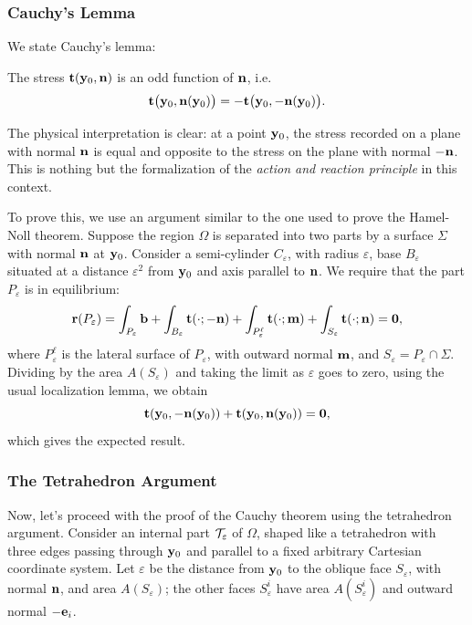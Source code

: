 \subsubsection{Cauchy’s Lemma}
We state Cauchy’s lemma:

\begin{definition}
	The stress \(\mathbf{t}(\mathbf{y}_0, \mathbf{n})\) is an odd function of \(\mathbf{n}\), i.e.
	\begin{equation}\label{lemmaC}
		\mathbf{t}\big(\mathbf{y}_0, \mathbf{n}(\mathbf{y}_0)\big) = -\mathbf{t}\big(\mathbf{y}_0, -\mathbf{n}(\mathbf{y}_0)\big).
	\end{equation}
\end{definition}

The physical interpretation is clear: at a point \(\mathbf{y}_0\), the stress recorded on a plane with normal \(\mathbf{n}\) is equal and opposite to the stress on the plane with normal \(-\mathbf{n}\). This is nothing but the formalization of the \textit{action and reaction principle} in this context.

To prove this, we use an argument similar to the one used to prove the Hamel-Noll theorem. Suppose the region \(\Omega\) is separated into two parts by a surface \(\Sigma\) with normal \(\mathbf{n}\) at \(\mathbf{y}_0\). Consider a semi-cylinder \(C_\varepsilon\), with radius \(\varepsilon\), base \(B_\varepsilon\) situated at a distance \(\varepsilon^2\) from \(\mathbf{y}_0\) and axis parallel to \(\mathbf{n}\). We require that the part \(P_\varepsilon\) is in equilibrium:
\begin{equation}
	\mathbf{r}(P_\varepsilon) = \int_{P_\varepsilon} \mathbf{b} + \int_{B_\varepsilon} \mathbf{t}(\cdot; -\mathbf{n}) + \int_{P^\ell_\varepsilon} \mathbf{t}(\cdot; \mathbf{m}) + \int_{S_\varepsilon} \mathbf{t}(\cdot; \mathbf{n}) = \mathbf{0},
\end{equation}
where \(P^\ell_\varepsilon\) is the lateral surface of \(P_\varepsilon\), with outward normal \(\mathbf{m}\), and \(S_\varepsilon = P_\varepsilon \cap \Sigma\). Dividing by the area \(A(S_\varepsilon)\) and taking the limit as \(\varepsilon\) goes to zero, using the usual localization lemma, we obtain
\begin{equation}
	\mathbf{t}(\mathbf{y}_0, -\mathbf{n}(\mathbf{y}_0)) + \mathbf{t}(\mathbf{y}_0, \mathbf{n}(\mathbf{y}_0)) = \mathbf{0},
\end{equation}
which gives the expected result.

\subsubsection{The Tetrahedron Argument}
Now, let’s proceed with the proof of the Cauchy theorem using the tetrahedron argument. Consider an internal part \(\mathcal{T}_\varepsilon\) of \(\Omega\), shaped like a tetrahedron with three edges passing through \(\mathbf{y}_0\) and parallel to a fixed arbitrary Cartesian coordinate system. Let \(\varepsilon\) be the distance from \(\mathbf{y}_0\) to the oblique face \(S_\varepsilon\), with normal \(\mathbf{n}\), and area \(A(S_\varepsilon)\); the other faces \(S^i_\varepsilon\) have area \(A(S^i_\varepsilon)\) and outward normal \(-\mathbf{e}_i\).

